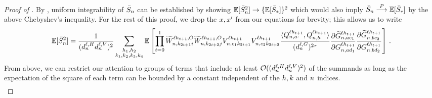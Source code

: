 \begin{proof}[Proof of ]
    By , uniform integrability of $\bar{S}_{n}$ can be established by showing $\operatorname*{\mathbb{E}} [ \bar{S}_{n}^2 ] \to \{ \operatorname*{\mathbb{E}} [ \bar{S}_{*} ] \}^2$ which would also imply $\bar{S}_{n} \overset{P}{\longrightarrow} \operatorname*{\mathbb{E}} [\bar{S}_{*}]$ by the above Chebyshev's inequality.
    For the rest of this proof, we drop the $x, x'$ from our equations for brevity; this allows us to write
    \begin{align*}
        \operatorname*{\mathbb{E}} [\bar{S}_{n}^2]
        =
        \frac{1}{(d_{n}^{\ell, H} d_{n}^{\ell, V})^2}
        \sum_{\substack{h_1, h_2 \\ k_1, k_2, k_3, k_4}}
            \operatorname*{\mathbb{E}} \left[
                \prod_{t = 0}^{1}
                \widetilde{W}_{n, k_{2t + 1} i}^{\ell h_{t + 1}, O}
                \widetilde{W}_{n, k_{2t + 2} j}^{\ell h_{t + 1}, O}
                V_{n, c_1 k_{2t + 1}}^{\ell h_{t + 1}}
                V_{n, c_2 k_{2t + 2}}^{\ell h_{t + 1}}
                \frac{
                    \langle
                        Q_{n, a \cdot}^{\ell h_{t + 1}}
                        ,
                        Q_{n, b \cdot}^{\ell h_{t+1}}
                    \rangle
                }{
                    (d_{n}^{\ell, G})^{2\tau}
                }
                \frac{
                    \partial
                    \widetilde{G}_{n, a c_1}^{\ell h_{t + 1}}
                }{
                    \partial
                    G_{n, a d_1}^{\ell h_{t + 1}}
                }
                \frac{
                    \partial
                    \widetilde{G}_{n, b c_2}^{\ell h_{t + 1}}
                }{
                    \partial
                    G_{n, b d_2}^{\ell h_{t + 1}}
                }
            \right]
        \, .
    \end{align*}
    From above, we can restrict our attention to groups of terms that include at least $\mathcal{O}((d_{n}^{\ell, H} d_{n}^{\ell, V})^2)$ of the summands as long as the expectation of the square of each term can be bounded by a constant independent of the $h, k$ and $n$ indices.
    \begin{align}\label{eq:wqk_weak_limit_bound}

\end{align}
\end{proof}
